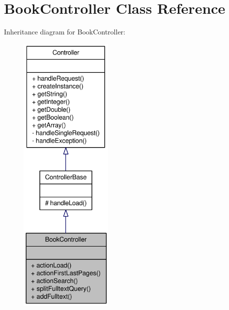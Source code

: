 \hypertarget{classBookController}{
\section{BookController Class Reference}
\label{classBookController}
}


Inheritance diagram for BookController:\nopagebreak
\begin{figure}[H]
\begin{center}
\leavevmode
\includegraphics[height=400pt]{classBookController__inherit__graph}
\end{center}
\end{figure}


